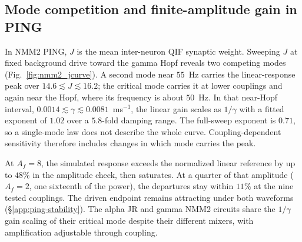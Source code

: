 \subsection{Mode competition and finite-amplitude gain in PING}\label{supp:ping-coupling-results}
In NMM2 PING, $J$ is the mean inter-neuron QIF synaptic weight.
Sweeping $J$ at fixed background drive toward the gamma Hopf reveals two
competing modes (Fig.~\ref{fig:nmm2_jcurve}). A second mode near $55$~Hz carries
the linear-response peak over $14.6\lesssim J\lesssim16.2$; the critical mode
carries it at lower couplings and again near the Hopf, where its frequency is
about $50$~Hz. In that near-Hopf interval,
$0.0014\lesssim\gamma\lesssim0.0081$~ms$^{-1}$, the linear gain scales as
$1/\gamma$ with a fitted exponent of $1.02$ over a $5.8$-fold damping range.
The full-sweep exponent is $0.71$, so a single-mode law does not describe the
whole curve. Coupling-dependent sensitivity \cite{clusella2023} therefore
includes changes in which mode carries the peak.

At $A_f=8$, the simulated response exceeds the normalized linear reference by
up to $48\%$ in the amplitude check, then saturates. At a quarter of that
amplitude ($A_f=2$, one sixteenth of the power), the departures stay within
$11\%$ at the nine tested couplings. The driven endpoint remains attracting under both waveforms
(\S\ref{app:ping-stability}).
The alpha JR and gamma NMM2 circuits share the $1/\gamma$ gain scaling of their critical mode despite their different
mixers, with amplification adjustable through coupling.

